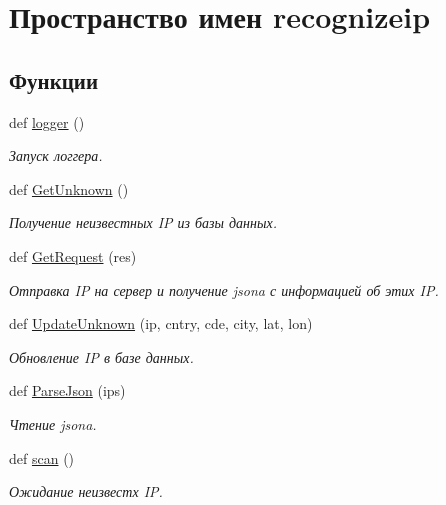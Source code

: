 \hypertarget{namespacerecognizeip}{}\section{Пространство имен recognizeip}
\label{namespacerecognizeip}
\subsection*{Функции}
\begin{DoxyCompactItemize}
\item 
def \hyperlink{namespacerecognizeip_a99d8f7a73addea7cea8ad5b0225e5005}{logger} ()
\begin{DoxyCompactList}\small\item\em Запуск логгера. \end{DoxyCompactList}\item 
def \hyperlink{namespacerecognizeip_a3bb8e2d63860a9c4027908b34014c56b}{Get\+Unknown} ()
\begin{DoxyCompactList}\small\item\em Получение неизвестных IP из базы данных. \end{DoxyCompactList}\item 
def \hyperlink{namespacerecognizeip_a362c41c14e0d237c722ab6c2234d6afa}{Get\+Request} (res)
\begin{DoxyCompactList}\small\item\em Отправка IP на сервер и получение json\textquotesingle{}a с информацией об этих IP. \end{DoxyCompactList}\item 
def \hyperlink{namespacerecognizeip_a7055bdccbd846aa71a7be77513548e08}{Update\+Unknown} (ip, cntry, cde, city, lat, lon)
\begin{DoxyCompactList}\small\item\em Обновление IP в базе данных. \end{DoxyCompactList}\item 
def \hyperlink{namespacerecognizeip_ad9b913f5fd7d2c429fb56302952d3d74}{Parse\+Json} (ips)
\begin{DoxyCompactList}\small\item\em Чтение json\textquotesingle{}a. \end{DoxyCompactList}\item 
def \hyperlink{namespacerecognizeip_a9fb9f625acd36513818c1ac2f236070d}{scan} ()
\begin{DoxyCompactList}\small\item\em Ожидание неизвестх IP. \end{DoxyCompactList}\item 

\end{DoxyCompactItemize}
